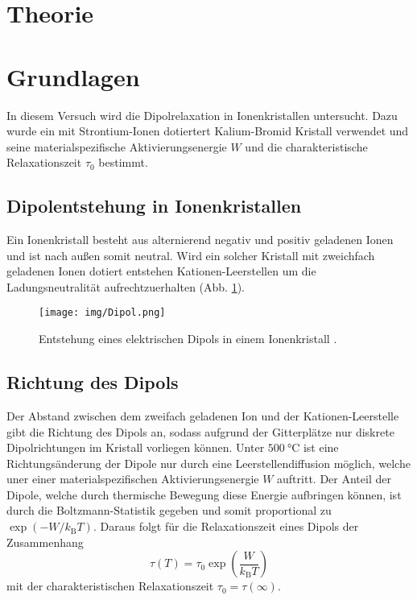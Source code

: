 \section{Theorie}
\label{sec:Theorie}


\section{Grundlagen}
\label{sec:grundlagen}

In diesem Versuch wird die Dipolrelaxation in Ionenkristallen untersucht. 
Dazu wurde ein mit Strontium-Ionen dotiertert Kalium-Bromid Kristall verwendet und seine materialspezifische Aktivierungsenergie $W$ und die charakteristische Relaxationszeit $\tau_0$ bestimmt.
\FloatBarrier

\subsection{Dipolentstehung in Ionenkristallen} %
\label{sub:dipolentstehung_in_ionenkristallen}

Ein Ionenkristall besteht aus alternierend negativ und positiv geladenen Ionen und ist nach außen somit neutral.
Wird ein solcher Kristall mit zweichfach geladenen Ionen dotiert entstehen Kationen-Leerstellen um die Ladungsneutralität aufrechtzuerhalten (Abb. \ref{fig:dipol}). 
\begin{figure}
    \centering
    \texttt{[image: img/Dipol.png]}
    \caption{Entstehung eines elektrischen Dipols in einem Ionenkristall \cite{V48}.}
    \label{fig:dipol}
\end{figure}

\subsection{Richtung des Dipols} %
\label{sub:richtung_des_dipols}

Der Abstand zwischen dem zweifach geladenen Ion und der Kationen-Leerstelle gibt die Richtung des Dipols an, sodass aufgrund der Gitterplätze nur diskrete Dipolrichtungen im Kristall vorliegen können.
Unter $\SI{500}{\celsius}$ ist eine Richtungsänderung der Dipole nur durch eine Leerstellendiffusion möglich, welche uner einer materialspezifischen Aktivierungsenergie $W$ auftritt.
Der Anteil der Dipole, welche durch thermische Bewegung diese Energie aufbringen können, ist durch die Boltzmann-Statistik gegeben und somit proportional zu $\exp{\left(-W/k_\text{B}T\right)}$.
Daraus folgt für die Relaxationszeit eines Dipols der Zusammenhang
\begin{equation}
    \tau(T) = \tau_0 \exp{\left(\frac{W}{k_\text{B}T}\right)}
\end{equation}
mit der charakteristischen Relaxationszeit $\tau_0 = \tau(\infty)$.


